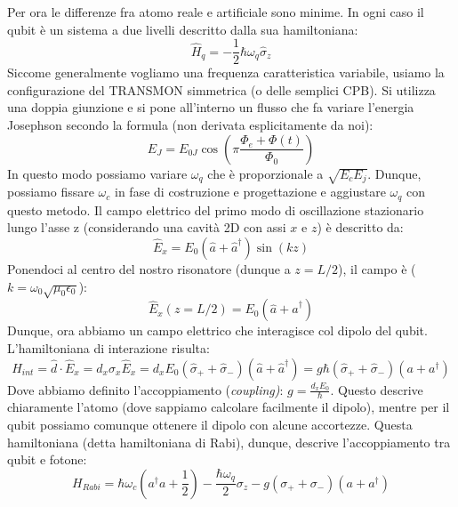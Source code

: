 Per ora le differenze fra atomo reale e artificiale sono minime. In ogni caso il qubit è un sistema a due livelli descritto dalla sua hamiltoniana:
\begin{equation*}
    \hat H_q=-\frac{1}{2}\hbar\omega_q\hat \sigma_z
\end{equation*}
Siccome generalmente vogliamo una frequenza caratteristica variabile, usiamo la configurazione del TRANSMON simmetrica (o delle semplici CPB). Si utilizza una doppia giunzione e si pone all'interno un flusso che fa variare l'energia Josephson secondo la formula (non derivata esplicitamente da noi):
\begin{equation*}
    E_J=E_{0J}\cos\left( \pi\frac{\Phi_e+\Phi(t)}{\Phi_0}\right)
\end{equation*}
In questo modo possiamo variare $\omega_q$ che è proporzionale a $\sqrt{E_c E_j}$.
Dunque, possiamo fissare $\omega_c$ in fase di costruzione e progettazione e aggiustare $\omega_q$ con questo metodo.
Il campo elettrico del primo modo di oscillazione stazionario lungo l'asse z (considerando una cavità 2D con assi $x$ e $z$) è descritto da:
\begin{equation*}
    \hat{E}_x=E_0(\hat a+\hat a^\dagger)\sin(kz)
\end{equation*}
Ponendoci al centro del nostro risonatore (dunque a $z=L/2$), il campo è ($k=\omega_0\sqrt{\mu_0\epsilon_0}$):
\begin{equation*}
    \hat E_x (z= L/2) = E_0 \left( \hat a + \hat a^\dagger \right)
\end{equation*}
Dunque, ora abbiamo un campo elettrico che interagisce col dipolo del qubit. L'hamiltoniana di interazione risulta:
\begin{equation*}
    \hat H_{int}=\hat d\cdot \hat E_x=d_x\hat \sigma_x \hat E_x =d_x E_0(\hat\sigma_{+}+\hat\sigma_{-})(\hat a+\hat a^\dagger)=g\hbar(\hat \sigma_{+}+\hat \sigma_{-})(a+a^\dagger)
\end{equation*}
Dove abbiamo definito l'accoppiamento (\textit{coupling)}: $g=\frac{d_xE_0}{\hbar}$.
Questo descrive chiaramente l'atomo (dove sappiamo calcolare facilmente il dipolo), mentre per il qubit possiamo comunque ottenere il dipolo con alcune accortezze.
Questa hamiltoniana (detta hamiltoniana di Rabi), dunque, descrive l'accoppiamento tra qubit e fotone:
\begin{equation*}
    H_{Rabi} = \hbar \omega_c \left( a^\dagger a + \frac{1}{2}\right) - \frac{\hbar \omega_q}{2} \sigma_z - g(\sigma_{+}+\sigma_{-})(a+a^\dagger)
\end{equation*}
